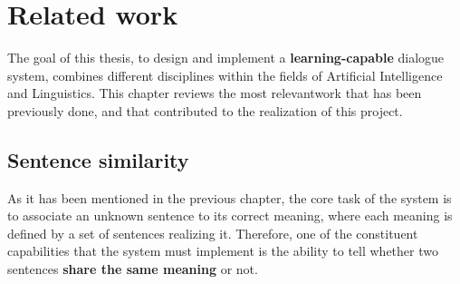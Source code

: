 
\chapter{Related work} %

\label{ch:rw} %


The goal of this thesis, to design and implement a \textbf{learning-capable} dialogue system, combines different disciplines within the fields of Artificial Intelligence and Linguistics. This chapter reviews the most relevantwork that has been previously done, and that contributed to the realization of this project.


\section{Sentence similarity}
As it has been mentioned in the previous chapter, the core task of the system is to associate an unknown sentence to its correct meaning, where each meaning is defined by a set of sentences realizing it. Therefore, one of the constituent capabilities that the system must implement is the ability to tell whether two sentences \textbf{share the same meaning} or not.

